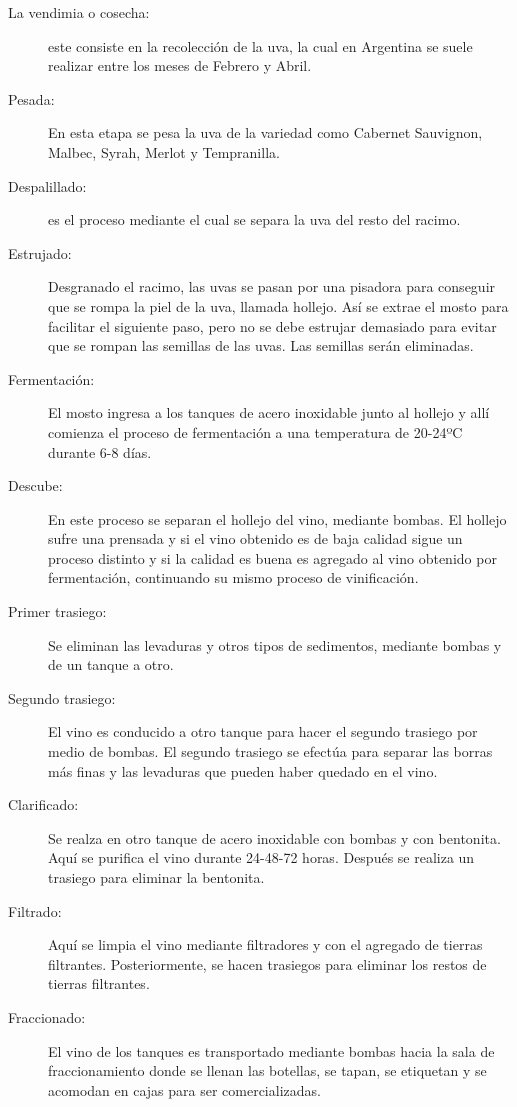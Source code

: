 \begin{description}
  \item[La vendimia o cosecha:] este consiste en la recolección de la uva, la cual en Argentina se suele realizar entre los meses de Febrero y Abril.
  \item[Pesada:] En esta etapa se pesa la uva de la variedad como Cabernet Sauvignon, Malbec, Syrah, Merlot y Tempranilla.
  \item[Despalillado:] es el proceso mediante el cual se separa la uva del resto del racimo.
  \item[Estrujado:] Desgranado el racimo, las uvas se pasan por una pisadora para conseguir que se rompa la piel de la uva, llamada hollejo. Así se extrae el mosto para facilitar el siguiente paso, pero no se debe estrujar demasiado para evitar que se rompan las semillas de las uvas. Las semillas serán eliminadas.
  \item[Fermentación:] El mosto ingresa a los tanques de acero inoxidable junto al hollejo y allí comienza el proceso de fermentación a una temperatura de 20-24ºC durante 6-8 días.
  \item[Descube:] En este proceso se separan el hollejo del vino, mediante bombas. El hollejo sufre una prensada y si el vino obtenido es de baja calidad sigue un proceso distinto y si la calidad es buena es agregado al vino obtenido por fermentación, continuando su mismo proceso de vinificación.
  \item[Primer trasiego:] Se eliminan las levaduras y otros tipos de sedimentos, mediante bombas y de un tanque a otro.
  \item[Segundo trasiego:] El vino es conducido a otro tanque para hacer el segundo trasiego por medio de bombas. El segundo trasiego se efectúa para separar las borras más finas y las levaduras que pueden haber quedado en el vino.
  \item[Clarificado:] Se realza en otro tanque de acero inoxidable con bombas y con bentonita. Aquí se purifica el vino durante 24-48-72 horas. Después se realiza un trasiego para eliminar la bentonita.
  \item[Filtrado:] Aquí se limpia el vino mediante filtradores y con el agregado de tierras filtrantes. Posteriormente, se hacen trasiegos para eliminar los restos de tierras filtrantes.
  \item[Fraccionado:] El vino de los tanques es transportado mediante bombas hacia la sala de fraccionamiento donde se llenan las botellas, se tapan, se etiquetan y se acomodan en cajas para ser comercializadas.
\end{description}

